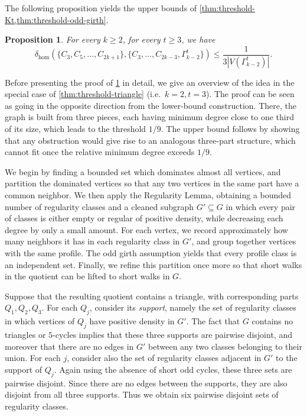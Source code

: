 \documentclass{article}
\newtheorem{proposition}[theorem]{Proposition}
\begin{document}
The following proposition yields the upper bounds of \cref{thm:threshold-Kt,thm:threshold-odd-girth}.

\begin{proposition}\label{prop:proof-upper-bound}
    For every $k \geq 2$, for every $t \geq 3$, we have \[\delta_{\hom}(\{C_3, C_5, \ldots, C_{2k+1}\}, \{C_3, \ldots, C_{2k-3}, \Gamma_{k-2}^t\}) \leq \frac{1}{3|V(\Gamma_{k-2}^t)|}.\]
\end{proposition}

Before presenting the proof of \cref{prop:proof-upper-bound} in detail, we give an overview of the idea in the special case of \cref{thm:threshold-triangle} (i.e.\ $k=2,t=3$). The proof can be seen as going in the opposite direction from the lower-bound construction. There, the graph is built from three pieces, each having minimum degree close to one third of its size, which leads to the threshold $1/9$. The upper bound follows by showing that any obstruction would give rise to an analogous three-part structure, which cannot fit once the relative minimum degree exceeds $1/9$.

We begin by finding a bounded set which dominates almost all vertices, and partition the dominated vertices so that any two vertices in the same part have a common neighbor. We then apply the Regularity Lemma, obtaining a bounded number of regularity classes and a cleaned subgraph $G'\subseteq G$ in which every pair of classes is either empty or regular of positive density, while decreasing each degree by only a small amount. For each vertex, we record approximately how many neighbors it has in each regularity class in $G'$, and group together vertices with the same profile. The odd girth assumption yields that every profile class is an independent set. Finally, we refine this partition once more so that short walks in the quotient can be lifted to short walks in $G$.

Suppose that the resulting quotient contains a triangle, with corresponding parts $Q_1,Q_2,Q_3$. For each $Q_j$, consider its \emph{support}, namely the set of regularity classes in which vertices of $Q_j$ have positive density in $G'$. The fact that $G$ contains no triangles or $5$-cycles implies that these three supports are pairwise disjoint, and moreover that there are no edges in $G'$ between any two classes belonging to their union. For each $j$, consider also the set of regularity classes adjacent in $G'$ to the support of $Q_j$. Again using the absence of short odd cycles, these three sets are pairwise disjoint. Since there are no edges between the supports, they are also disjoint from all three supports. Thus we obtain six pairwise disjoint sets of regularity classes.
\end{document}
